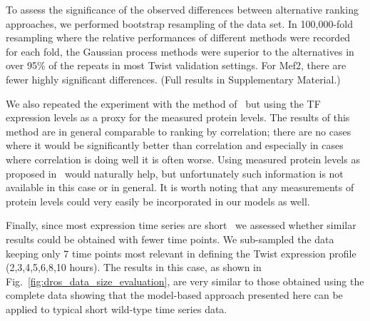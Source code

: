 \documentclass{pnastwo}
\begin{document}
\begin{article}
To assess the significance of the observed differences between
alternative ranking approaches, we performed bootstrap
resampling of the data set.  In 100,000-fold resampling where the
relative performances of different methods were recorded for each
fold, the Gaussian process methods were superior to the alternatives
in over 95\% of the repeats in most Twist validation settings.
For Mef2, there are fewer highly significant differences.
(Full results in Supplementary Material.)

We also repeated the experiment with the method of~\cite{Gatta2008}
but using the TF expression levels as a proxy for the measured protein
levels.  The results of this method are in general comparable to
ranking by correlation; there are no cases where it would be
significantly better than correlation and especially in cases where
correlation is doing well it is often worse.
Using measured protein levels as proposed in~\cite{Gatta2008} would
naturally help, but unfortunately such information is not available in
this case or in general.  It is worth noting that any measurements of
protein levels could very easily be incorporated in our models as well.

Finally, since most expression time series are short~\cite{Ernst2005}
we assessed whether similar results could be obtained with fewer time
points. We sub-sampled the data keeping only 7 time points most
relevant in defining the Twist expression profile
(2,3,4,5,6,8,10 hours). The results in this case, as shown in
Fig.~\ref{fig:dros_data_size_evaluation}, are very similar to 
those obtained using the complete data showing that the model-based
approach presented here can be applied to typical short wild-type time
series data.


\end{article}
\end{document}
